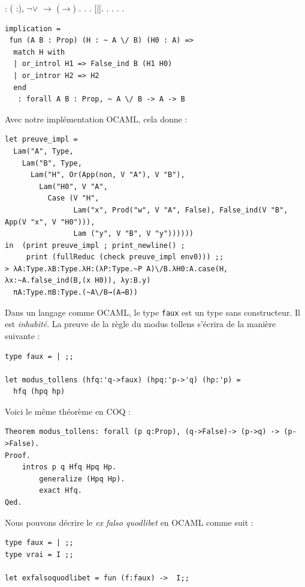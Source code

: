 \documentclass[11pt]{book}
\begin{document}
\begin{coqdoccode}
\coqdocnoindent
{}  : \coqdockw{\ensuremath{\forall}} ( :), \ensuremath{\lnot}\ensuremath{\lor} \ensuremath{\rightarrow} (\ensuremath{\rightarrow}) .\coqdoceol
\coqdocnoindent
{}.\coqdoceol
\coqdocindent{1.00em}
.\coqdoceol
\coqdocindent{1.00em}
   [\ensuremath{|}].\coqdoceol
\coqdocindent{1.00em}
.\coqdoceol
\coqdocindent{1.00em}
.\coqdoceol
\coqdocnoindent
{}.\coqdoceol
\coqdocemptyline
\coqdocnoindent
{} .\coqdoceol
\begin{Verbatim}
implication = 
 fun (A B : Prop) (H : ~ A \/ B) (H0 : A) =>
  match H with
  | or_introl H1 => False_ind B (H1 H0)
  | or_intror H2 => H2
  end
   : forall A B : Prop, ~ A \/ B -> A -> B
\end{Verbatim}
\end{coqdoccode}


Avec notre implémentation OCAML, cela donne :
\begin{Verbatim}
let preuve_impl =
  Lam("A", Type,
    Lam("B", Type,
      Lam("H", Or(App(non, V "A"), V "B"),
        Lam("H0", V "A",
          Case (V "H", 
                Lam("x", Prod("w", V "A", False), False_ind(V "B", App(V "x", V "H0"))),
                Lam ("y", V "B", V "y")))))) 
in  (print preuve_impl ; print_newline() ;
     print (fullReduc (check preuve_impl env0))) ;;
> λA:Type.λB:Type.λH:(λP:Type.~P A)\/B.λH0:A.case(H, λx:~A.false_ind(B,(x H0)), λy:B.y)
  πA:Type.πB:Type.(~A\/B→(A→B))
\end{Verbatim}

Dans un langage comme OCAML, le type \verb+faux+ est un type sans constructeur.
Il est \textit{inhabité}. La preuve de la règle du modus tollens s'écrira de la manière suivante :
\begin{Verbatim}
type faux = | ;;

let modus_tollens (hfq:'q->faux) (hpq:'p->'q) (hp:'p) =
  hfq (hpq hp)
\end{Verbatim}
Voici le même théorème en COQ :
\begin{Verbatim}
Theorem modus_tollens: forall (p q:Prop), (q->False)-> (p->q) -> (p->False).
Proof.
	intros p q Hfq Hpq Hp.
        generalize (Hpq Hp).
        exact Hfq.
Qed.
\end{Verbatim}
Nous pouvons décrire le \textit{ex falso quodlibet} en OCAML comme suit :
\begin{Verbatim}
type faux = | ;;
type vrai = I ;;

let exfalsoquodlibet = fun (f:faux) ->  I;;
\end{Verbatim}
\end{document}

